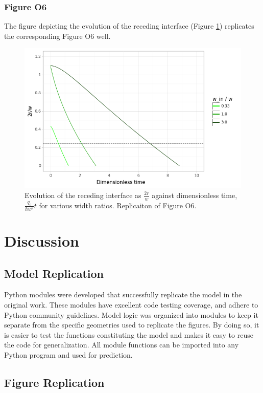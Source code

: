 \subsubsection{Figure O6}

The figure depicting the evolution of the receding interface (Figure \ref{fig6}) replicates
the corresponding Figure O6 well.

\begin{figure}[ht]
  \centering
  \includegraphics[width=0.8\linewidth]{../figures/fig_6.png}
  \caption{Evolution of the receding interface as $\frac{2r}{w}$ against dimensionless time,
  $\frac{q_c}{hw^2}t$ for various width ratios. Replicaiton of Figure O6.}
  \label{fig6}
\end{figure}

\section{Discussion}

\subsection{Model Replication}

Python modules were developed that successfully replicate the model in the original work.
These modules have excellent code testing coverage, and adhere to Python community guidelines.
Model logic was organized into modules to keep it separate from the specific geometries
used to replicate the figures. By doing so, it is easier to test the functions constituting
the model and makes it easy to reuse the code for generalization. All module functions can be
imported into any Python program and used for prediction.

\subsection{Figure Replication}

